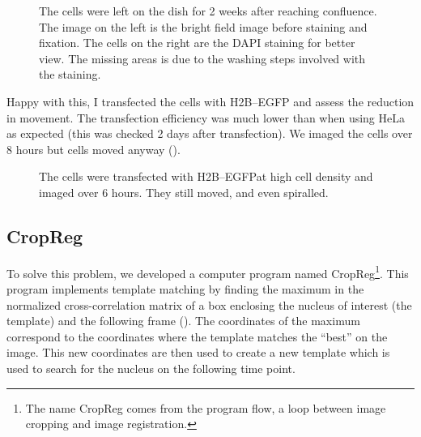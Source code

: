     \begin{figure}
      \centering
                   {The cells were left on the dish for 2 weeks after reaching confluence. The
                    image on the left is the bright field image before staining and fixation.
                    The cells on the right are the DAPI staining for better view. The missing
                    areas is due to the washing steps involved with the staining.}
      \label{fig:healthy-horse}
    \end{figure}
    
    Happy with this, I transfected the cells with H2B--EGFP and assess the reduction in movement.
    The transfection efficiency was much lower than when using HeLa as expected (this was checked 2 days
    after transfection). We imaged the cells over 8 hours but cells moved anyway ().
    
    \begin{figure}
      \centering
                   {The cells were transfected with H2B--EGFPat high cell density and
                    imaged over 6 hours. They still moved, and even spiralled.}
      \label{fig:horse-moving}
    \end{figure}



  \subsection{CropReg}
  
    To solve this problem, we developed a computer program named CropReg\footnote{The name CropReg
    comes from the program flow, a loop between image cropping and image registration.}. This
    program implements template matching by
    finding the maximum in the normalized cross-correlation matrix of a
    box enclosing the nucleus of interest (the template) and the following frame (). The
    coordinates of the maximum correspond to the coordinates where the template matches the ``best'' on the
    image. This new coordinates are then used to create a new template which is used to search for the nucleus
    on the following time point.
    
